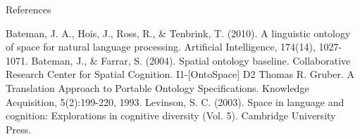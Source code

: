 \documentclass[12pt,a4paper]{beamer}
\begin{document}


\begin{frame}[allowframebreaks]{References}
\begin{thebibliography}{-}
 Bateman, J. A., Hois, J., Ross, R., \& Tenbrink, T. (2010). A linguistic ontology of space for natural language processing. Artificial Intelligence, 174(14), 1027-1071.
 Bateman, J., \& Farrar, S. (2004). Spatial ontology baseline. Collaborative Research Center for Spatial Cognition. I1-[OntoSpace] D2
 Thomas R. Gruber. A Translation Approach to Portable Ontology Specifications. Knowledge Acquisition, 5(2):199-220, 1993.
 Levinson, S. C. (2003). Space in language and cognition: Explorations in cognitive diversity (Vol. 5). Cambridge University Press.
\end{thebibliography}
\end{frame}
\end{document}
